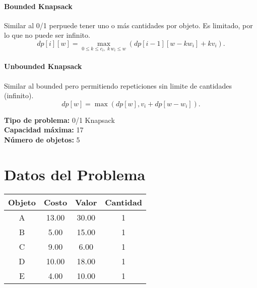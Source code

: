\documentclass{article}
\begin{document}
\paragraph{Bounded Knapsack} Similar al 0/1 perpuede tener uno o más cantidades por objeto. Es limitado, por lo que no puede ser infinito. 
\[
dp[i][w] = 
\max_{0 \leq k \leq c_i,\; k\,w_i \leq w} \left( dp[i-1][w - k w_i] + k v_i \right).
\]

\paragraph{Unbounded Knapsack} Similar al bounded pero permitiendo repeticiones sin limite de cantidades (infinito).
\[
dp[w] = \max ( dp[w], v_i + dp[w - w_i] ).
\]

\thispagestyle{empty}
\newpage
\textbf{Tipo de problema:} 0/1 Knapsack\\
\textbf{Capacidad máxima:} 17\\
\textbf{Número de objetos:} 5\\

\section*{Datos del Problema}
\begin{tabular}{|c|c|c|c|}
\hline
Objeto & Costo & Valor & Cantidad \\
\hline
A & 13.00 & 30.00 & 1 \\
B & 5.00 & 15.00 & 1 \\
C & 9.00 & 6.00 & 1 \\
D & 10.00 & 18.00 & 1 \\
E & 4.00 & 10.00 & 1 \\
\hline
\end{tabular}
\end{document}
